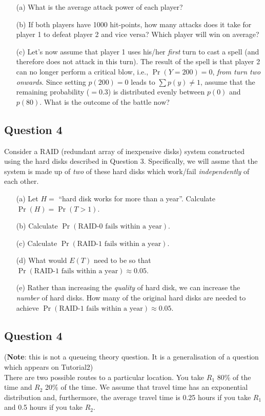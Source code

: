 \documentclass[]{report}
\begin{document}
\begin{itemize}
\item[(a)] What is the average attack power of each player?  \item[(b)] If both players have 1000 hit-points, how many attacks does it take for player 1 to defeat player 2 and vice versa? Which player will win on average?  \item[(c)] Let's now assume that player 1 uses his/her \emph{first} turn to cast a spell (and therefore does not attack in this turn). The result of the spell is that player 2 can no longer perform a critical blow, i.e., $\Pr(Y=200) = 0$, \emph{from turn two onwards}. Since setting $p(200) = 0$ leads to $\sum p(y) \ne 1$, assume that the remaining probability ($= 0.3$) is distributed evenly between $p(0)$ and $p(80)$. What is the outcome of the battle now?
\end{itemize}

\subsection*{Question 4}
Consider a RAID (redundant array of inexpensive disks) system constructed using the hard disks described in Question 3. Specifically, we will assme that the system is made up of \emph{two} of these hard disks which work/fail \emph{independently} of each other.\\[-0.2cm]
\begin{itemize}
\item[(a)] Let $H =$  ``hard disk works for more than a year''. Calculate $\Pr(H) = \Pr(T > 1)$.  \\\item[(b)] Calculate $\Pr(\text{RAID-0 fails within a year})$.  \item[(c)] Calculate $\Pr(\text{RAID-1 fails within a year})$.   \item[(d)] What would $E(T)$ need to be so that $\Pr(\text{RAID-1 fails within a year}) \approx 0.05$.  \item[(e)] Rather than increasing the \emph{quality} of hard disk, we can increase the \emph{number} of hard disks. How many of the original hard disks are needed to achieve $\Pr(\text{RAID-1 fails within a year}) \approx 0.05$.
\end{itemize}



\subsection*{Question 4}
{\footnotesize({\bf Note}: this is not a queueing theory question. It is a generalisation of a question which appears on Tutorial2)}\\[0.1cm]
There are two possible routes to a particular location. You take $R_1$ 80\% of the time and $R_2$ 20\% of the time. We assume that travel time has an exponential distribution and, furthermore, the average travel time is 0.25 hours if you take $R_1$ and 0.5 hours if you take $R_2$.\\[-0.2cm]
\end{document}
